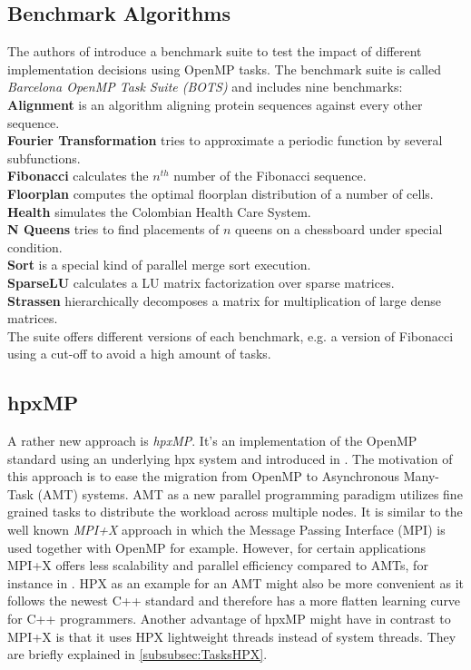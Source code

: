      
\subsection{Benchmark Algorithms}
\label{subsec:BOTS}
  The authors of \cite{Duran.2009} introduce a benchmark suite to test the impact of different implementation decisions using OpenMP tasks.
  The benchmark suite is called \textit{Barcelona OpenMP Task Suite (BOTS)} and includes nine benchmarks:\\
    \textbf{Alignment} is an algorithm aligning protein sequences against every other sequence.\\
    \textbf{Fourier Transformation} tries to approximate a periodic function by several subfunctions.\\
    \textbf{Fibonacci} calculates the \(n^{th}\) number of the Fibonacci sequence.\\
    \textbf{Floorplan} computes the optimal floorplan distribution of a number of cells.\\
    \textbf{Health} simulates the Colombian Health Care System.\\
    \textbf{N Queens} tries to find placements of \(n\) queens on a chessboard under special condition.\\
    \textbf{Sort} is a special kind of parallel merge sort execution.\\
    \textbf{SparseLU} calculates a LU matrix factorization over sparse matrices.\\
    \textbf{Strassen} hierarchically decomposes a matrix for multiplication of large dense matrices.\\
  The suite offers different versions of each benchmark, e.g. a version of Fibonacci using a cut-off to avoid a high amount of tasks.
 
 
\subsection{hpxMP}
  A rather new approach is \textit{hpxMP}.
  It's an implementation of the OpenMP standard using an underlying hpx system and introduced in \cite{hpxMP.2019}.
  The motivation of this approach is to ease the migration from OpenMP to Asynchronous Many-Task (AMT) systems.
  AMT as a new parallel programming paradigm utilizes fine grained tasks to distribute the workload across multiple nodes.
  It is similar to the well known \textit{MPI+X} approach in which the Message Passing Interface (MPI) is used together with OpenMP for example.
  However, for certain applications MPI+X offers less scalability and parallel efficiency compared to AMTs, for instance in \cite{Dai.11172019}.
  HPX as an example for an AMT might also be more convenient as it follows the newest C++ standard and therefore has a more flatten learning curve for C++ programmers.
  Another advantage of hpxMP might have in contrast to MPI+X is that it uses HPX lightweight threads instead of system threads.
  They are briefly explained in \ref{subsubsec:TasksHPX}.
  
